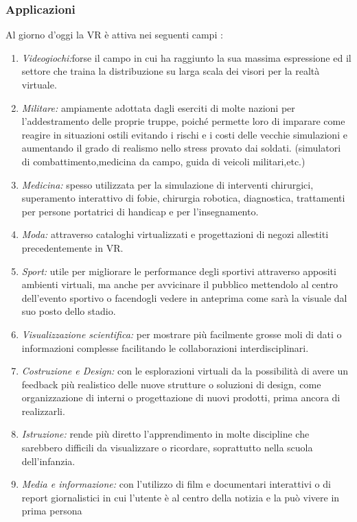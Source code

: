 \subsubsection{Applicazioni }
Al giorno d'oggi la VR è attiva nei seguenti campi \cite{VRApplications}:
\begin{enumerate}
	\item \textit{Videogiochi:}forse il campo in cui ha raggiunto la sua massima espressione ed il settore che traina la distribuzione su larga scala dei visori per la realtà virtuale.
	\item \textit{Militare:} ampiamente adottata dagli eserciti di molte nazioni per l'addestramento delle proprie truppe, poiché permette loro di imparare come reagire in situazioni ostili evitando i rischi e i costi delle vecchie simulazioni e aumentando il grado di realismo nello stress provato dai soldati. (simulatori di combattimento,medicina da campo, guida di veicoli militari,etc.)
	\item \textit{Medicina:} spesso utilizzata per la simulazione di interventi chirurgici, superamento interattivo di fobie, chirurgia robotica, diagnostica, trattamenti per persone portatrici di handicap e per l'insegnamento.
	\item \textit{Moda:} attraverso cataloghi virtualizzati e progettazioni di negozi allestiti precedentemente in VR.
	\item \textit{Sport:} utile per migliorare le performance degli sportivi attraverso appositi ambienti virtuali, ma anche per avvicinare il pubblico mettendolo al centro dell'evento sportivo o facendogli vedere in anteprima come sarà la visuale dal suo posto dello stadio.
	\item \textit{Visualizzazione scientifica:} per mostrare più facilmente grosse moli di dati o informazioni complesse facilitando le collaborazioni interdisciplinari.
	\item \textit{Costruzione e Design:} con le esplorazioni virtuali da la possibilità di avere un feedback più realistico delle nuove strutture o soluzioni di design, come organizzazione di interni o progettazione di nuovi prodotti, prima ancora di realizzarli.
	\item \textit{Istruzione:} rende più diretto l'apprendimento in molte discipline che sarebbero difficili da visualizzare o ricordare, soprattutto nella scuola dell'infanzia.
	\item \textit{Media e informazione:} con l'utilizzo di film e documentari interattivi o di report giornalistici in cui l'utente è al centro della notizia e la può vivere in prima persona
	
\end{enumerate}

